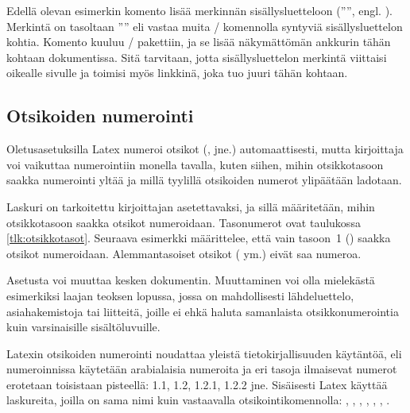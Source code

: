 Edellä olevan esimerkin komento  lisää
merkinnän sisällysluetteloon ('''', engl.
). Merkintä on tasoltaan
'''' eli vastaa muita \-/ komennolla
syntyviä sisällysluettelon kohtia. Komento 
kuuluu \-/ pakettiin, ja se lisää näkymättömän
ankkurin tähän kohtaan dokumentissa. Sitä tarvitaan, jotta
sisällysluettelon merkintä viittaisi oikealle sivulle ja toimisi myös
linkkinä, joka tuo juuri tähän kohtaan.

\subsection{Otsikoiden numerointi}
\label{luku:otsikot_numerointi}

Oletusasetuksilla Latex numeroi otsikot (,
 jne.) automaattisesti, mutta kirjoittaja voi vaikuttaa
numerointiin monella tavalla, kuten siihen, mihin otsikkotasoon saakka
numerointi yltää ja millä tyylillä otsikoiden numerot ylipäätään
ladotaan.

Laskuri  on tarkoitettu kirjoittajan
asetettavaksi, ja sillä määritetään, mihin otsikkotasoon saakka otsikot
numeroidaan. Tasonumerot ovat taulukossa \ref{tlk:otsikkotasot}.
Seuraava esimerkki määrittelee, että vain tasoon~1 ()
saakka otsikot numeroidaan. Alemmantasoiset otsikot
( ym.) eivät saa numeroa.

\begin{koodilohkosis}
\setcounter{secnumdepth}{1}
\end{koodilohkosis}

Asetusta voi muuttaa kesken dokumentin. Muuttaminen voi olla mielekästä
esimerkiksi laajan teoksen lopussa, jossa on mahdollisesti
lähdeluettelo, asiahakemistoja tai liitteitä, joille ei ehkä haluta
samanlaista otsikkonumerointia kuin varsinaisille sisältöluvuille.

Latexin otsikoiden numerointi noudattaa yleistä tietokirjallisuuden
käytäntöä, eli numeroinnissa käytetään arabialaisia numeroita ja eri
tasoja ilmaisevat numerot erotetaan toisistaan pisteellä: 1.1, 1.2,
1.2.1, 1.2.2 jne. Sisäisesti Latex käyttää laskureita, joilla on sama
nimi kuin vastaavalla otsikointikomennolla: ,
, , ,
, , .

